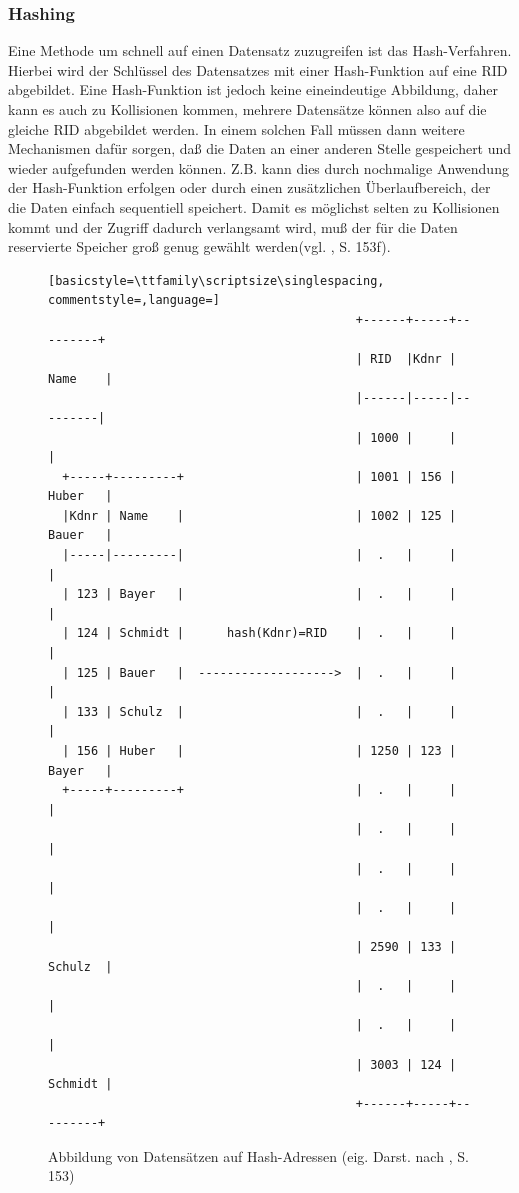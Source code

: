\subsubsection{Hashing}
Eine Methode um schnell auf einen Datensatz zuzugreifen ist das Hash-Verfahren. Hierbei wird der Schlüssel des Datensatzes mit einer Hash-Funktion auf eine RID abgebildet. Eine Hash-Funktion ist jedoch keine eineindeutige Abbildung, daher kann es auch zu Kollisionen kommen, mehrere Datensätze können also auf die gleiche RID abgebildet werden. In einem solchen Fall müssen dann weitere Mechanismen dafür sorgen, daß die Daten an einer anderen Stelle gespeichert und wieder aufgefunden werden können. Z.B. kann dies durch nochmalige Anwendung der Hash-Funktion erfolgen oder durch einen zusätzlichen Überlaufbereich, der die Daten einfach sequentiell speichert. Damit es möglichst selten zu Kollisionen kommt und der Zugriff dadurch verlangsamt wird, muß der für die Daten reservierte Speicher groß genug gewählt werden(vgl. \cite{Sauer1998}, S. 153f).
\begin{figure}[h]
\begin{lstlisting}[basicstyle=\ttfamily\scriptsize\singlespacing, commentstyle=,language=]
                                           +------+-----+---------+
                                           | RID  |Kdnr | Name    |
                                           |------|-----|---------|
                                           | 1000 |     |         |
  +-----+---------+                        | 1001 | 156 | Huber   |
  |Kdnr | Name    |                        | 1002 | 125 | Bauer   |
  |-----|---------|                        |  .   |     |         |
  | 123 | Bayer   |                        |  .   |     |         |
  | 124 | Schmidt |      hash(Kdnr)=RID    |  .   |     |         |
  | 125 | Bauer   |  ------------------->  |  .   |     |         |
  | 133 | Schulz  |                        |  .   |     |         |
  | 156 | Huber   |                        | 1250 | 123 | Bayer   |
  +-----+---------+                        |  .   |     |         |
                                           |  .   |     |         |
                                           |  .   |     |         |
                                           |  .   |     |         |
                                           | 2590 | 133 | Schulz  |
                                           |  .   |     |         |
                                           |  .   |     |         |
                                           | 3003 | 124 | Schmidt |
                                           +------+-----+---------+
\end{lstlisting}
\caption[Abbildung von Datensätzen auf Hash-Adressen]{Abbildung von Datensätzen auf Hash-Adressen (eig. Darst. nach \cite{Sauer1998}, S. 153)}
\label{hash}
\end{figure}
